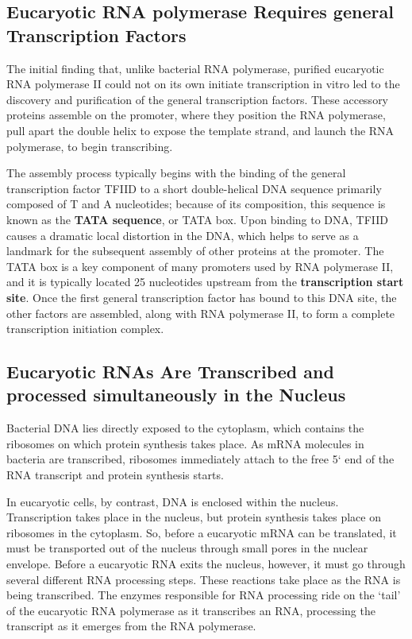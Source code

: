 \subsection{Eucaryotic RNA polymerase Requires general Transcription Factors}

The initial finding that, unlike bacterial RNA polymerase, purified eucaryotic
RNA polymerase II could not on its own initiate transcription in vitro
led to the discovery and purification of the general transcription factors.
These accessory proteins assemble on the promoter, where they position
the RNA polymerase, pull apart the double helix to expose the template
strand, and launch the RNA polymerase, to begin transcribing.

The assembly process typically
begins with the binding of the general transcription factor TFIID to a short
double-helical DNA sequence primarily composed of T and A nucleotides;
because of its composition, this sequence is known as the \textbf{TATA sequence},
or TATA box. Upon binding to DNA, TFIID causes a dramatic local distortion in the DNA,
which helps to serve as a landmark for the
subsequent assembly of other proteins at the promoter. The TATA box is
a key component of many promoters used by RNA polymerase II, and it
is typically located 25 nucleotides upstream from the \textbf{transcription start
site}. Once the first general transcription factor has bound to this DNA site,
the other factors are assembled, along with RNA polymerase II, to form a
complete transcription initiation complex.


\subsection{Eucaryotic RNAs Are Transcribed and processed simultaneously in the Nucleus}

Bacterial DNA lies directly exposed to the cytoplasm,
which contains the ribosomes on which protein synthesis takes place.
As mRNA molecules in bacteria are transcribed, ribosomes immediately
attach to the free 5` end of the RNA transcript and protein synthesis
starts.

In eucaryotic cells, by contrast, DNA is enclosed within the nucleus.
Transcription takes place in the nucleus, but protein synthesis takes place
on ribosomes in the cytoplasm. So, before a eucaryotic mRNA can be
translated, it must be transported out of the nucleus through small pores
in the nuclear envelope. Before a eucaryotic RNA exits the
nucleus, however, it must go through several different RNA processing
steps. These reactions take place as the RNA is being transcribed. The
enzymes responsible for RNA processing ride on the ‘tail’ of the eucaryotic
RNA polymerase as it transcribes an RNA, processing the transcript as
it emerges from the RNA polymerase.

